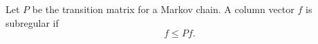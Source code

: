 Let $P$ be the transition matrix for a Markov chain. A column vector $f$ is subregular if
$$f \leq Pf.$$
